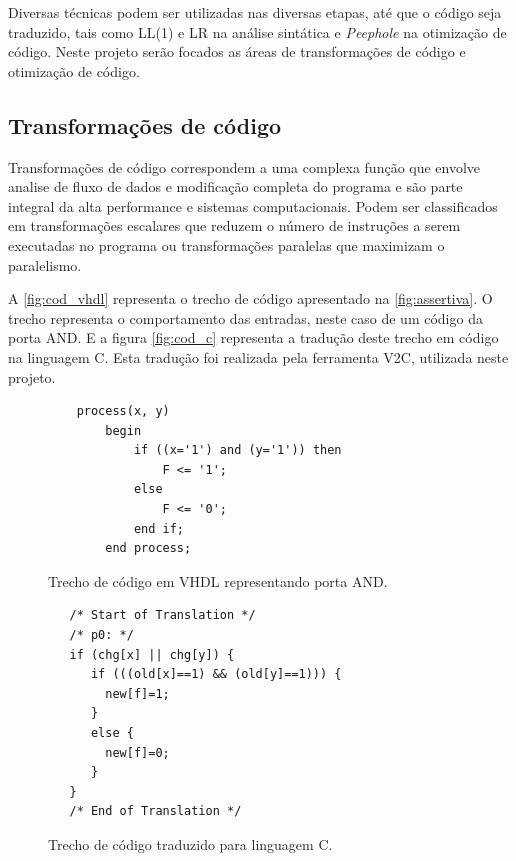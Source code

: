 \par
Diversas técnicas podem ser utilizadas nas diversas etapas, até que o código seja traduzido, tais como LL(1) e LR na análise sintática e \textit{Peephole} na otimização de código\cite{aho2007compilers}. Neste projeto serão focados as áreas de transformações de código e otimização de código.
\subsection{Transformações de código}
\par
Transformações de código correspondem a uma complexa função que envolve analise de fluxo de dados e modificação completa do programa e são parte integral da alta performance e sistemas computacionais. Podem ser classificados em transformações escalares que reduzem o número de instruções a serem executadas no programa ou transformações paralelas que maximizam o paralelismo.\cite{srikant2002compiler}

\par
A \autoref{fig:cod_vhdl} representa o trecho de código apresentado na \autoref{fig:assertiva}. O trecho representa o comportamento das entradas, neste caso de um código da porta AND. E a figura \autoref{fig:cod_c} representa a tradução deste trecho em código na linguagem C. Esta tradução foi realizada pela ferramenta V2C, utilizada neste projeto.

\begin{figure}[thp]
\caption{\label{fig:cod_vhdl} Trecho de código em VHDL representando porta AND.}
	\begin{center}
    \begin{minipage}{0.9\textwidth}
    \begin{lstlisting}       
	process(x, y)
    	begin
        	if ((x='1') and (y='1')) then
            	F <= '1';
        	else
            	F <= '0';
        	end if;
    	end process;
\end{lstlisting}
    \end{minipage}
	\end{center}
\end{figure}

\begin{figure}[thp]
\caption{\label{fig:cod_c} Trecho de código traduzido para linguagem C.}
	\begin{center}
    \begin{minipage}{0.9\textwidth}
    \begin{lstlisting}       
   /* Start of Translation */
   /* p0: */
   if (chg[x] || chg[y]) {
      if (((old[x]==1) && (old[y]==1))) {
      	new[f]=1;
      }
      else {
      	new[f]=0;
      }
   }
   /* End of Translation */

	\end{lstlisting}
    \end{minipage}
	\end{center}
\end{figure}

